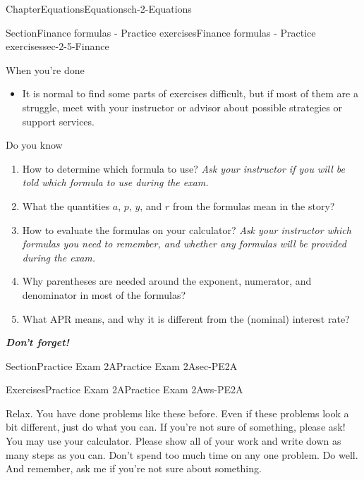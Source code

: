 \documentclass[twoside,11pt,]{book}
\newcommand{\alert}[1]{\textbf{\textit{#1}}}
\numberwithin{equation}{section}
\begin{document}
\begin{chapterptx}{Chapter}{Equations}{}{Equations}{}{}{ch-2-Equations}
\begin{sectionptx}{Section}{Finance formulas - Practice exercises}{}{Finance formulas - Practice exercises}{}{}{sec-2-5-Finance}
\begin{conclusion}{When you're done \textellipsis{}}
\begin{itemize}[label=\textbullet]
\item{}It is normal to find some parts of exercises difficult, but if most of them are a struggle, meet with your instructor or advisor about possible strategies or support services.%
\end{itemize}
%
\end{conclusion}%
\begin{conclusion}{Do you know \textellipsis{}}%
%
\begin{enumerate}[label={\Alph*.}]
\item{}How to determine which formula to use? \emph{Ask your instructor if you will be told which formula to use during the exam.}%
\item{}What the quantities \(a\), \(p\), \(y\), and \(r\) from the formulas mean in the story?%
\item{}How to evaluate the formulas on your calculator?  \emph{Ask your instructor which formulas you need to remember, and whether any formulas will be provided during the exam.}%
\item{}Why parentheses are needed around the exponent, numerator, and denominator in most of the formulas?%
\item{}What APR means, and why it is different from the (nominal) interest rate?%
\end{enumerate}
%
\par
\alert{Don't forget!}%
\end{conclusion}%
\end{sectionptx}
%
%
\typeout{************************************************}
\typeout{************************************************}
%
\begin{sectionptx}{Section}{Practice Exam 2A}{}{Practice Exam 2A}{}{}{sec-PE2A}
%
%
\typeout{************************************************}
\typeout{************************************************}
%
\begin{exercises-subsection-numberless}{Exercises}{Practice Exam 2A}{}{Practice Exam 2A}{}{}{ws-PE2A}
\begin{introduction}{}%
Relax. You have done problems like these before. Even if these problems look a bit different, just do what you can. If you're not sure of something, please ask! You may use your calculator. Please show all of your work and write down as many steps as you can. Don't spend too much time on any one problem. Do well. And remember, ask me if you're not sure about something.%
\par

\end{introduction}
\end{exercises-subsection-numberless}
\end{sectionptx}
\end{chapterptx}
\end{document}
